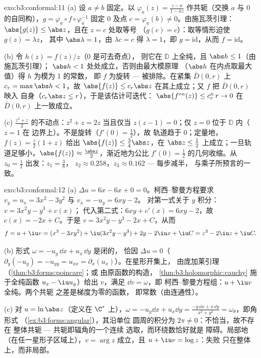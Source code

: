 \begin{solution}{exo:b3:conformal:11}
(a) 设 $a \neq b$ 固定。以 $\varphi_a(z) =
\frac{z - a}{1 - \bar az}$ 作共轭（交换 $a$
与 $0$ 的自同构），$g = \varphi_a\circ f\circ\varphi_a^{-1}$ 固定
$0$ 及点 $c = \varphi_a(b) \neq 0$。由施瓦茨引理：
$\abs{g(z)} \leq \abs z$，且在 $z = c$ 处取等号
（$g(c) = c$）：取等情形迫使 $g(z) = \lambda z$，
其中 $\abs\lambda = 1$，由 $\lambda c = c$ 得 $\lambda =
1$，即 $g = \mathrm{id}$，从而 $f = \mathrm{id}$。

(b) 令 $h(z) = f(z)/z$（$0$ 是可去奇点），
则它在 $\mathbb D$ 上全纯，且 $\abs h \leq 1$（由施瓦茨引理）；
$\abs h < 1$ 处处成立，否则由最大模原理
（$\abs h$ 在内点取最大值）得 $h$ 为模为 1 的常数，
即 $f$ 为旋转 --- 被排除。在紧集
$\bar D(0,r)$ 上 $c_r = \max\abs h < 1$，故 $\abs{f(z)} \leq
c_r\abs z$ 在其上成立；又 $f$ 把 $\bar D(0,r)$ 映入
自身（$c_r\abs z \leq r$），于是该估计可迭代：
$\abs{f^{\circ n}(z)} \leq c_r^n\,r \to 0$ 在
$\bar D(0, r)$ 上一致成立。

(c) $\frac{z^2 + z}2$ 的不动点：$z^2 + z = 2z$
当且仅当 $z(z - 1) = 0$；仅 $z = 0$ 位于 $\mathbb D$ 内（$z = 1$ 在
边界上）。不是旋转（$f'(0) = \frac12$），故
轨道趋于 $0$；定量地，$f(z) = \frac z2(1 + z)$
给出 $\abs{f(z)} \leq \frac{3}{4}\abs z$，在 $\abs z \leq
\frac12$ 上成立；一旦轨道足够小，$\abs{f(z)} \approx
\frac{\abs z}2$，渐近地为公比
$f'(0) = \frac12$ 的几何收缩。从 $z_0 = \frac12$ 出发：$z_1 = \frac38$，
$z_2 \approx 0.258$，$z_3 \approx 0.162$ --- 每步减半，
与乘子所预言的一致。
\end{solution}

\begin{solution}{exo:b3:conformal:12}
(a) $\Delta u = 6x - 6x + 0 = 0$。柯西--黎曼方程要求
$v_y = u_x = 3x^2 - 3y^2$ 与 $v_x = -u_y = 6xy - 2$。
对第一式关于 $y$ 积分：$v = 3x^2y - y^3 + c(x)$；
代入第二式：$6xy + c'(x) = 6xy - 2$，故 $c(x)
= -2x + C$。于是 $v = 3x^2y - y^3 - 2x + C$，从而
\[
f = u + \iu v = (x^3 - 3xy^2) + \iu(3x^2y - y^3)
+ 2y - 2\iu x + \iu C = z^3 - 2\iu z + \iu C .
\]

(b) 形式 $\omega = -u_y\,\dd x + u_x\,\dd y$ 是闭的，
恰因 $\Delta u = 0$（$\partial_y(-u_y) =
-u_{yy} = u_{xx} = \partial_x(u_x)$）。在星形开集上，
由庞加莱引理（\cref{thm:b3:forms:poincare}；或
由原函数的构造，
\cref{thm:b3:holomorphic:cauchy} 施于全纯函数
$u_x - \iu u_y$）给出 $v$，满足 $\dd v = \omega$，即
柯西--黎曼方程组：$u + \iu v$ 全纯。两个共轭
之差是梯度为零的函数，
即常数（由连通性）。

(c) 对 $u = \ln\abs z$（定义在 $\C^*$ 上），$\omega = -u_y\dd x +
u_x\dd y = \frac{-y\,\dd x + x\,\dd y}{x^2 + y^2} =
\omega_\theta$，即角形式
（\cref{ex:b3:forms:angular}），其沿单位
圆周的积分为 $2\pi \neq 0$：不恰当，故不存在
整体共轭 --- 共轭即辐角的一个连续
选取，而环绕数恰好就是
障碍。局部地（在任一星形子区域上），$v =
\arg z$ 成立，且 $u + \iu v = \log z$：失败
只在整体上，而非局部。
\end{solution}

